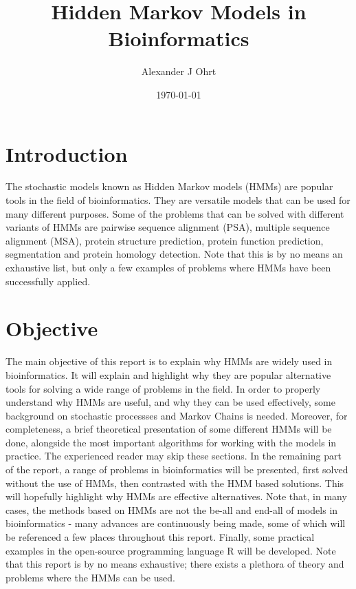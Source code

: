 \documentclass{article}\usepackage[]{graphicx}\usepackage[]{color}
\title{Hidden Markov Models in Bioinformatics}
\author{Alexander J Ohrt}
\date{\today}
\begin{document}
\maketitle

\tableofcontents

\section{Introduction}
The stochastic models known as Hidden Markov models (HMMs) are popular tools in the field of bioinformatics. They are versatile models that can be used for many different purposes. Some of the problems that can be solved with different variants of HMMs are pairwise sequence alignment (PSA), multiple sequence alignment (MSA), protein structure prediction, protein function prediction, segmentation and protein homology detection. Note that this is by no means an exhaustive list, but only a few examples of problems where HMMs have been successfully applied. 

\section{Objective}

The main objective of this report is to explain why HMMs are widely used in bioinformatics. It will explain and highlight why they are popular alternative tools for solving a wide range of problems in the field. In order to properly understand why HMMs are useful, and why they can be used effectively, some background on stochastic processses and Markov Chains is needed. Moreover, for completeness, a brief theoretical presentation of some different HMMs will be done, alongside the most important algorithms for working with the models in practice. The experienced reader may skip these sections. In the remaining part of the report, a range of problems in bioinformatics will be presented, first solved without the use of HMMs, then contrasted with the HMM based solutions. This will hopefully highlight why HMMs are effective alternatives. Note that, in many cases, the methods based on HMMs are not the be-all and end-all of models in bioinformatics - many advances are continuously being made, some of which will be referenced a few places throughout this report. Finally, some practical examples in the open-source programming language R will be developed. Note that this report is by no means exhaustive; there exists a plethora of theory and problems where the HMMs can be used. 
\end{document}
